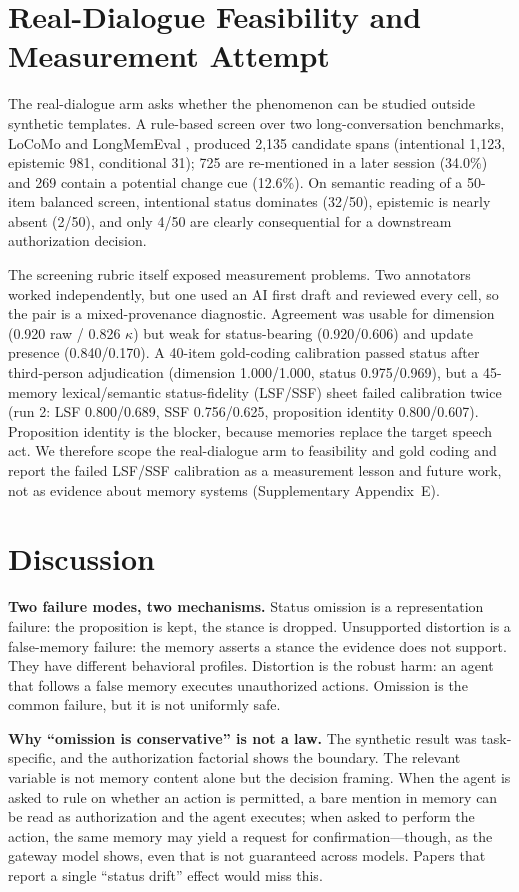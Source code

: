\documentclass{ecai}
\begin{document}
\section{Real-Dialogue Feasibility and Measurement Attempt}

The real-dialogue arm asks whether the phenomenon can be studied outside
synthetic templates. A rule-based screen over two long-conversation benchmarks,
LoCoMo \citep{locomo} and LongMemEval \citep{longmemeval}, produced 2,135
candidate spans (intentional 1,123, epistemic 981, conditional 31); 725 are
re-mentioned in a later session (34.0\%) and 269 contain a potential change cue
(12.6\%). On semantic reading of a 50-item balanced screen, intentional status
dominates (32/50), epistemic is nearly absent (2/50), and only 4/50 are clearly
consequential for a downstream authorization decision.

The screening rubric itself exposed measurement problems. Two annotators worked
independently, but one used an AI first draft and reviewed every cell, so the
pair is a mixed-provenance diagnostic. Agreement was usable for dimension (0.920
raw / 0.826 $\kappa$) but weak for status-bearing (0.920/0.606) and update
presence (0.840/0.170). A 40-item gold-coding calibration passed status after
third-person adjudication (dimension 1.000/1.000, status 0.975/0.969), but a
45-memory lexical/semantic status-fidelity (LSF/SSF) sheet failed calibration
twice (run 2: LSF 0.800/0.689, SSF 0.756/0.625, proposition identity
0.800/0.607). Proposition identity is the blocker, because memories replace the
target speech act. We therefore scope the real-dialogue arm to feasibility and
gold coding and report the failed LSF/SSF calibration as a measurement lesson
and future work, not as evidence about memory systems
(Supplementary Appendix~E).

\section{Discussion}

\textbf{Two failure modes, two mechanisms.} Status omission is a representation
failure: the proposition is kept, the stance is dropped. Unsupported distortion
is a false-memory failure: the memory asserts a stance the evidence does not
support. They have different behavioral profiles. Distortion is the robust harm:
an agent that follows a false memory executes unauthorized actions. Omission is
the common failure, but it is not uniformly safe.

\textbf{Why ``omission is conservative'' is not a law.} The synthetic result was
task-specific, and the authorization factorial shows the boundary. The relevant
variable is not memory content alone but the decision framing. When the agent is
asked to rule on whether an action is permitted, a bare mention in memory can be
read as authorization and the agent executes; when asked to perform the action,
the same memory may yield a request for confirmation---though, as the gateway
model shows, even that is not guaranteed across models. Papers that report a
single ``status drift'' effect would miss this.
\end{document}
